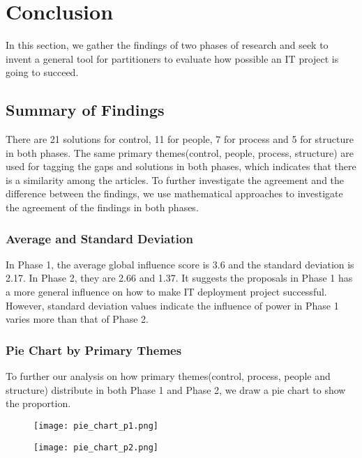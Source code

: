 
\section{Conclusion}
In this section, we gather the findings of two phases of research and seek to invent a general tool for partitioners to evaluate how possible an IT project is going to succeed.

\subsection{Summary of Findings}
There are 21 solutions for control, 11 for people, 7 for process and 5 for structure in both phases. The same primary themes(control, people, process, structure) are used for tagging the gaps and solutions in both phases, which indicates that there is a similarity among the articles. To further investigate the agreement and the difference between the findings, we use mathematical approaches to investigate the agreement of the findings in both phases.

\subsubsection{Average and Standard Deviation}
In Phase 1, the average global influence score is 3.6 and the standard deviation is 2.17. In Phase 2, they are 2.66 and 1.37. It suggests the proposals in Phase 1 has a more general influence on how to make IT deployment project successful. However, standard deviation values indicate the influence of power in Phase 1 varies more than that of Phase 2.
\subsubsection{Pie Chart by Primary Themes}
To further our analysis on how primary themes(control, process, people and structure) distribute in both Phase 1 and Phase 2, we draw a pie chart to show the proportion.

\begin{figure}[!ht]
\centering
\begin{minipage}{.5\textwidth}
  \centering
  \texttt{[image: pie\_chart\_p1.png]}
  \label{pie:1}
\end{minipage}%
\begin{minipage}{.5\textwidth}
  \centering
  \texttt{[image: pie\_chart\_p2.png]}
  \label{pie:2}
\end{minipage}
\end{figure}


